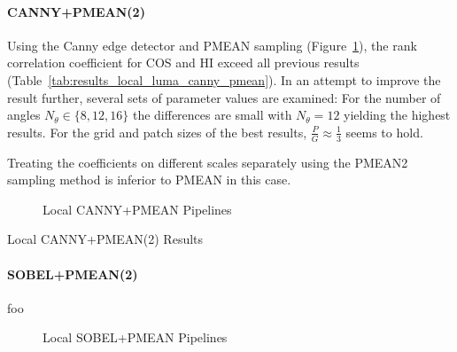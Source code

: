 \paragraph{CANNY+PMEAN(2)}

Using the Canny edge detector and PMEAN sampling
(Figure~\ref{fig:pipeline_local_luma_canny_pmean}), the rank correlation
coefficient for COS and HI exceed all previous results
(Table~\ref{tab:results_local_luma_canny_pmean}). In an attempt to improve the
result further, several sets of parameter values are examined: For the number
of angles $N_{\theta} \in \{8, 12, 16\}$ the differences are small with
$N_{\theta} = 12$ yielding the highest results. For the grid and patch sizes of
the best results, $\frac{P}{G} \approx \frac{1}{3}$ seems to hold.

Treating the coefficients on different scales separately using the PMEAN2
sampling method is inferior to PMEAN in this case.

\begin{figure}[h!]
    \centering
    
    \caption[Local CANNY+PMEAN Pipelines]{
        Local CANNY+PMEAN Pipelines
    }
    \label{fig:pipeline_local_luma_canny_pmean}
\end{figure}

\begin{table}[h!]
    \centering
    \quad
    \caption[Local CANNY+PMEAN(2) Results]{
        Local CANNY+PMEAN(2) Results
    }
    \label{tab:results_local_luma_canny_pmean_all}
\end{table}

\paragraph{SOBEL+PMEAN(2)}

foo

\begin{figure}[h]
    \centering
    
    \caption[Local SOBEL+PMEAN Pipelines]{
        Local SOBEL+PMEAN Pipelines
    }
    \label{fig:pipeline_local_luma_sobel_pmean}
\end{figure}

